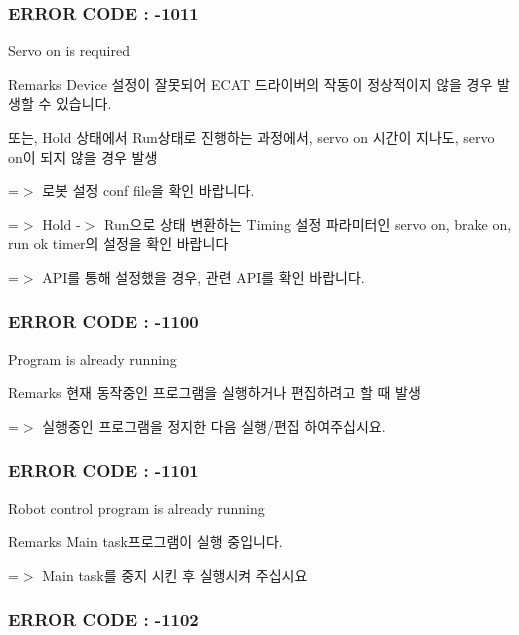  \subsubsection*{E\-R\-R\-O\-R C\-O\-D\-E \-: -\/1011 }

Servo on is required \begin{DoxyRemark}{Remarks}
Device 설정이 잘못되어 E\-C\-A\-T 드라이버의 작동이 정상적이지 않을 경우 발생할 수 있습니다. \par
 또는, Hold 상태에서 Run상태로 진행하는 과정에서, servo on 시간이 지나도, servo on이 되지 않을 경우 발생 \par
 =$>$ 로봇 설정 conf file을 확인 바랍니다. \par
 =$>$ Hold -\/$>$ Run으로 상태 변환하는 Timing 설정 파라미터인 servo on, brake on, run ok timer의 설정을 확인 바랍니다 \par
 =$>$ A\-P\-I를 통해 설정했을 경우, 관련 A\-P\-I를 확인 바랍니다. \par

\end{DoxyRemark}


 \subsubsection*{E\-R\-R\-O\-R C\-O\-D\-E \-: -\/1100 }

Program is already running \begin{DoxyRemark}{Remarks}
현재 동작중인 프로그램을 실행하거나 편집하려고 할 때 발생 \par
 =$>$ 실행중인 프로그램을 정지한 다음 실행/편집 하여주십시요.
\end{DoxyRemark}


 \subsubsection*{E\-R\-R\-O\-R C\-O\-D\-E \-: -\/1101 }

Robot control program is already running \begin{DoxyRemark}{Remarks}
Main task프로그램이 실행 중입니다. \par
 =$>$ Main task를 중지 시킨 후 실행시켜 주십시요
\end{DoxyRemark}


 \subsubsection*{E\-R\-R\-O\-R C\-O\-D\-E \-: -\/1102 }


